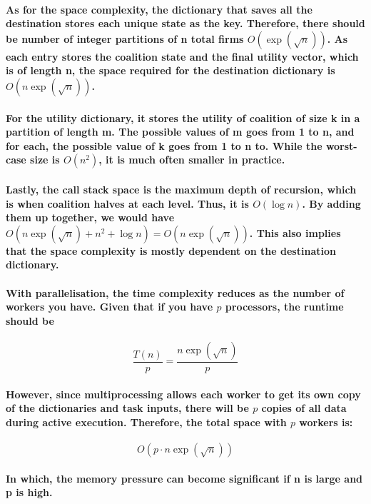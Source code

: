 \documentclass[11pt]{report}
\begin{document}
\paragraph{As for the space complexity, the dictionary that saves all the destination stores each unique state as the key. Therefore, there should be number of integer partitions of n total firms $O(\exp({\sqrt{n}}))$. As each entry stores the coalition state and the final utility vector, which is of length n, the space required for the destination dictionary is $O(n\exp(\sqrt{n}))$. }

\paragraph{For the utility dictionary, it stores the utility of coalition of size k in a partition of length m. The possible values of m goes from 1 to n, and for each, the possible value of k goes from 1 to n to. While the worst-case size is $O(n^2)$, it is much often smaller in practice. }

\paragraph{Lastly, the call stack space is the maximum depth of recursion, which is when coalition halves at each level. Thus, it is $O(\log n)$. By adding them up together, we would have $O(n\exp(\sqrt{n}) + n^2 + \log n) = O(n\exp(\sqrt{n})) $. This also implies that the space complexity is mostly dependent on the destination dictionary. }

\paragraph{With parallelisation, the time complexity reduces as the number of workers you have. Given that if you have $p$ processors, the runtime should be }
\[\frac{T(n)}{p}=\frac{n\exp(\sqrt{n})}{p}\]

\paragraph{However, since multiprocessing allows each worker to get its own copy of the dictionaries and task inputs, there will be $p$ copies of all data during active execution. Therefore, the total space with $p$ workers is: }
\[O(p\cdot n\exp(\sqrt{n}))\]
\paragraph{In which, the memory pressure can become significant if n is large and p is high.  }
\end{document}
